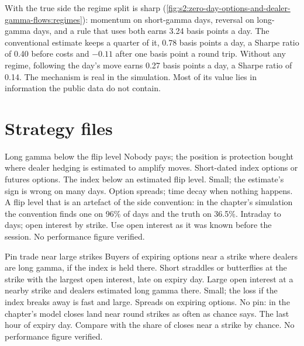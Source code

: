 With the true side the regime split is sharp (\cref{fig:s2:zero-day-options-and-dealer-gamma-flows:regimes}): momentum on short-gamma days,
reversal on long-gamma days, and a rule that uses both earns 3.24 basis points a day. The conventional estimate keeps a quarter of it, 0.78 basis
points a day, a Sharpe ratio of 0.40 before costs and $-0.11$ after one basis point a round trip. Without any regime, following the day's move earns
0.27 basis points a day, a Sharpe ratio of 0.14. The mechanism is real in the simulation. Most of its value lies in information the public data do not
contain.

\section{Strategy files}

\begin{strategyfile}{Long gamma below the flip level}\label{strat:s2:zero-day-options-and-dealer-gamma-flows:flip}
 Nobody pays; the position is protection bought where dealer hedging is estimated to amplify moves.
 Short-dated index options or futures options.
 The index below an estimated flip level.
 Small; the estimate's sign is wrong on many days.
 Option spreads; time decay when nothing happens.
 A flip level that is an artefact of the side convention: in the chapter's simulation the convention finds one on 96\% of days and
the truth on 36.5\%.
 Intraday to days; open interest by strike.
 Use open interest as it was known before the session.
 No performance figure verified.
\end{strategyfile}

\begin{strategyfile}{Pin trade near large strikes}\label{strat:s2:zero-day-options-and-dealer-gamma-flows:pin}
 Buyers of expiring options near a strike where dealers are long gamma, if the index is held there.
 Short straddles or butterflies at the strike with the largest open interest, late on expiry day.
 Large open interest at a nearby strike and dealers estimated long gamma there.
 Small; the loss if the index breaks away is fast and large.
 Spreads on expiring options.
 No pin: in the chapter's model closes land near round strikes as often as chance says.
 The last hour of expiry day.
 Compare with the share of closes near a strike by chance.
 No performance figure verified.
\end{strategyfile}

